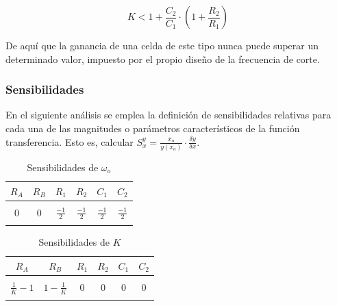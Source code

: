 \begin{equation}
    K < 1 + \frac{C_2}{C_1} \cdot (1 + \frac{R_2}{R_1})
\end{equation}

De aqu\'i que la ganancia de una celda de este tipo nunca puede superar un determinado valor, impuesto por el propio dise\~no de la frecuencia de corte.

\subsubsection{Sensibilidades}
En el siguiente an\'alisis se emplea la definici\'on de sensibilidades relativas para cada una de las magnitudes o par\'ametros caracter\'isticos de la funci\'on transferencia. Esto es,
calcular $S^{y}_x = \frac{x_o}{y(x_o)} \cdot \frac{\delta y}{\delta x}$.

\begin{table}[H]
    \centering
    \begin{tabular}{c c c c c c}
        $R_A$ & $R_B$ & $R_1$ & $R_2$ & $C_1$ & $C_2$ \\
        \hline \\
        $0$ & $0$ & $\frac{-1}{2}$ & $\frac{-1}{2}$ & $\frac{-1}{2}$ & $\frac{-1}{2}$ \\
        \\
        \hline
    \end{tabular}
    \caption{Sensibilidades de $\omega_o$}
\end{table}

\begin{table}[H]
    \centering
    \begin{tabular}{c c c c c c}
        $R_A$ & $R_B$ & $R_1$ & $R_2$ & $C_1$ & $C_2$ \\
        \hline \\
        $\frac{1}{K} - 1$ & $1 - \frac{1}{K}$ & $0$ & $0$ & $0$ & $0$ \\
        \\
        \hline
    \end{tabular}
    \caption{Sensibilidades de $K$}
\end{table}


